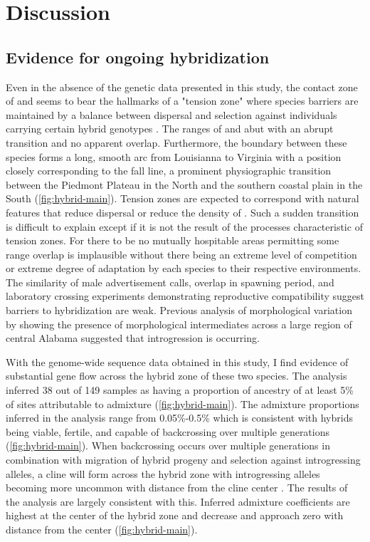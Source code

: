 \section{Discussion}
\subsection{Evidence for ongoing hybridization}
Even in the absence of the genetic data presented in this study, the contact zone 
of \amer and \terr seems to bear the hallmarks of a "tension zone" where 
species barriers are maintained by a balance between dispersal and selection 
against individuals carrying certain hybrid genotypes \parencite{barton1985}.
The ranges of \amer and \terr abut with an abrupt transition and no apparent overlap. 
Furthermore, the boundary between these species forms a long, smooth arc from Louisianna 
to Virginia with a position closely corresponding to the fall line, 
a prominent physiographic transition between the Piedmont Plateau in the North 
and the southern coastal plain in the South (\cref{fig:hybrid-main}).
Tension zones are expected to correspond with natural features that reduce
dispersal or reduce the density of \parencite{barton1979}.
Such a sudden transition is difficult to explain except if it is not the result of 
the processes characteristic of tension zones. 
For there to be no mutually hospitable areas permitting some range overlap is 
implausible without there being an extreme level of competition or extreme degree 
of adaptation by each species to their respective environments.
The similarity of male advertisement calls, overlap in spawning period, and
laboratory crossing experiments demonstrating reproductive compatibility suggest
barriers to hybridization are weak.
Previous analysis of morphological variation by \cite{weatherby1982} 
showing the presence of morphological intermediates across a large region of 
central Alabama suggested that introgression is occurring.

With the genome-wide sequence data obtained in this study, I find evidence of
substantial gene flow across the hybrid zone of these two species.
The \structure analysis inferred 38 out of 149 samples as having a proportion of 
ancestry of at least 5\% of sites attributable to admixture (\cref{fig:hybrid-main}). 
The admixture proportions inferred in the \structure analysis range 
from 0.05\%-0.5\% which is consistent with hybrids being viable, fertile, and 
capable of backcrossing over multiple generations \citationNeeded (\cref{fig:hybrid-main}). 
When backcrossing occurs over multiple generations in combination with migration
of hybrid progeny and selection against introgressing alleles, a cline will form 
across the hybrid zone with introgressing alleles becoming more uncommon with
distance from the cline center \parencite{barton1985}.
The results of the \structure analysis are largely consistent with this.
Inferred admixture coefficients are highest at the center of the hybrid zone 
and decrease and approach zero with distance from the center (\cref{fig:hybrid-main}).

